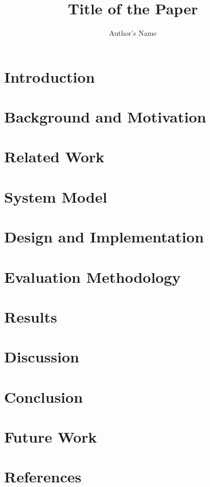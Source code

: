 \documentclass{article}
\title{Title of the Paper}
\author{Author's Name}
\begin{document}
\maketitle

\begin{abstract}
\end{abstract}

\tableofcontents

\listoffigures

\listoftables

\section{Introduction}

\section{Background and Motivation}

\section{Related Work}

\section{System Model}

\section{Design and Implementation}

\section{Evaluation Methodology}

\section{Results}

\section{Discussion}

\section{Conclusion}

\section{Future Work}

\section{References}

\appendix
\end{document}
